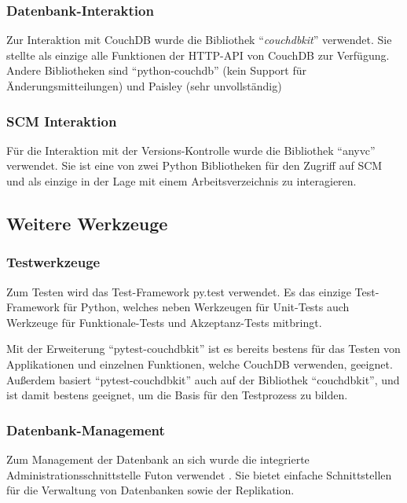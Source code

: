 \subsubsection{Datenbank-Interaktion}

Zur Interaktion mit CouchDB wurde die Bibliothek ``\emph{couchdbkit}'' \cite{couchdbkit:website} verwendet.
Sie stellte als einzige alle Funktionen der HTTP-API von CouchDB zur Verfügung.
Andere Bibliotheken sind ``python-couchdb'' (kein Support für Änderungsmitteilungen)
und Paisley (sehr unvollständig)

\subsubsection{SCM Interaktion}

Für die Interaktion mit der Versions-Kontrolle wurde die Bibliothek ``anyvc'' \cite{anyvc:website} verwendet.
Sie ist eine von zwei Python Bibliotheken für den Zugriff auf SCM
und als einzige in der Lage mit einem Arbeitsverzeichnis zu interagieren.

\subsection{Weitere Werkzeuge}

\subsubsection{Testwerkzeuge}

Zum Testen wird das Test-Framework py.test \cite{pytest:website} verwendet.
Es das einzige Test-Framework für Python,
welches neben Werkzeugen für Unit-Tests auch Werkzeuge für
Funktionale-Tests und Akzeptanz-Tests mitbringt.

Mit der Erweiterung ``pytest-couchdbkit'' \cite{pytest:couchdbkit} ist es bereits
bestens für das Testen von Applikationen und einzelnen Funktionen,
welche CouchDB verwenden, geeignet.
Außerdem basiert ``pytest-couchdbkit'' auch auf der Bibliothek ``couchdbkit'',
und ist damit bestens geeignet, um die Basis für den Testprozess zu bilden.

\subsubsection{Datenbank-Management}

Zum Management der Datenbank an sich wurde die integrierte Administrationsschnittstelle Futon verwendet \cite{couchdb:futon}.
Sie bietet einfache Schnittstellen für die Verwaltung von Datenbanken sowie der Replikation.

